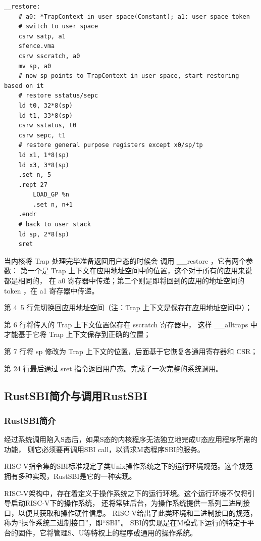 \begin{lstlisting}[language={riscv}, label={code:restore},
    caption={__restore}]
__restore:
    # a0: *TrapContext in user space(Constant); a1: user space token
    # switch to user space
    csrw satp, a1
    sfence.vma
    csrw sscratch, a0
    mv sp, a0
    # now sp points to TrapContext in user space, start restoring based on it
    # restore sstatus/sepc
    ld t0, 32*8(sp)
    ld t1, 33*8(sp)
    csrw sstatus, t0
    csrw sepc, t1
    # restore general purpose registers except x0/sp/tp
    ld x1, 1*8(sp)
    ld x3, 3*8(sp)
    .set n, 5
    .rept 27
        LOAD_GP %n
        .set n, n+1
    .endr
    # back to user stack
    ld sp, 2*8(sp)
    sret
\end{lstlisting}

当内核将 Trap 处理完毕准备返回用户态的时候会 调用 __restore ，它有两个参数：
第一个是 Trap 上下文在应用地址空间中的位置，这个对于所有的应用来说都是相同的，
在 a0 寄存器中传递；第二个则是即将回到的应用的地址空间的 token ，在 a1 寄存器中传递。

第 4~5 行先切换回应用地址空间（注：Trap 上下文是保存在应用地址空间中）；

第 6 行将传入的 Trap 上下文位置保存在 sscratch 寄存器中，
这样 __alltraps 中才能基于它将 Trap 上下文保存到正确的位置；

第 7 行将 sp 修改为 Trap 上下文的位置，后面基于它恢复各通用寄存器和 CSR；

第 24 行最后通过 sret 指令返回用户态。完成了一次完整的系统调用。


\subsection{RustSBI简介与调用RustSBI}

\subsubsection{RustSBI简介}

经过系统调用陷入S态后，如果S态的内核程序无法独立地完成U态应用程序所需的功能，
则它必须要再调用SBI call，以请求M态程序SBI的服务。

RISC-V指令集的SBI标准规定了类Unix操作系统之下的运行环境规范。这个规范拥有多种实现，RustSBI是它的一种实现。

RISC-V架构中，存在着定义于操作系统之下的运行环境。这个运行环境不仅将引导启动RISC-V下的操作系统， 
还将常驻后台，为操作系统提供一系列二进制接口，以便其获取和操作硬件信息。 
RISC-V给出了此类环境和二进制接口的规范，称为“操作系统二进制接口”，即“SBI”。
SBI的实现是在M模式下运行的特定于平台的固件，它将管理S、U等特权上的程序或通用的操作系统。

